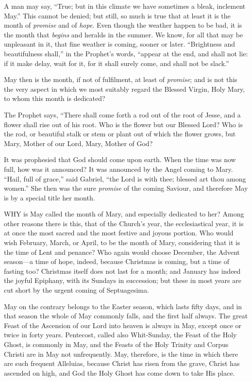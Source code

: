 A man may say, ``True; but in
this climate we have sometimes a bleak, inclement May.'' This cannot be
denied; but still, so much is true that at least it is the month of \emph{promise}
and of \emph{hope}. Even though the weather happen to be bad, it is the
month that \emph{begins} and heralds in the summer. We know, for all
that may be unpleasant in it, that fine weather is coming, sooner or
later. ``Brightness and beautifulness shall,'' in the Prophet's words, ``appear
at the end, and shall not lie: if it make delay, wait for it, for it
shall surely come, and shall not be slack.''

May then is the month, if not of
fulfilment, at least of \emph{promise}; and is not this the very aspect
in which we most suitably regard the Blessed Virgin, Holy Mary, to whom
this month is dedicated?

The Prophet says, ``There shall
come forth a rod out of the root of Jesse, and a flower shall rise out
of his root. Who is the flower but our Blessed Lord? Who is the rod, or
beautiful stalk or stem or plant out of which the flower grows, but
Mary, Mother of our Lord, Mary, Mother of God?

It was prophesied that God
should come upon earth. When the time was now full, how was it
announced? It was announced by the Angel coming to Mary. ``Hail, full of
grace,'' said Gabriel, ``the Lord is with thee; blessed art thou among
women.'' She then was the sure \emph{promise} of the coming Saviour, and
therefore May is by a special title her month.



WHY
is May called the month of Mary, and especially dedicated to her? Among
other reasons there is this, that of the Church's year, the
ecclesiastical year, it is at once the most sacred and the most festive
and joyous portion. Who would wish February, March, or April, to be the
month of Mary, considering that it is the time of Lent and penance? Who
again would choose December, the Advent season—a time of hope, indeed,
because Christmas is coming, but a time of fasting too? Christmas itself
does not last for a month; and January has indeed the joyful Epiphany,
with its Sundays in succession; but these in most years are cut short by
the urgent coming of Septuagesima.

May on the contrary belongs to
the Easter season, which lasts fifty days, and in that season the whole
of May commonly falls, and the first half always. The great Feast of the
Ascension of our Lord into heaven is always in May, except once or twice
in forty years. Pentecost, called also Whit-Sunday, the Feast of the
Holy Ghost, is commonly in May, and the Feasts of the Holy Trinity and
Corpus Christi are in May not unfrequently. May, therefore, is the time
in which there are such frequent Alleluias, because Christ has risen
from the grave, Christ has ascended on high, and God the Holy Ghost has
come down to take His place.

